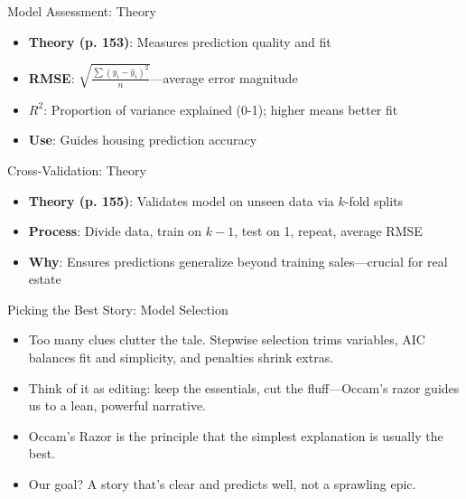 \documentclass{beamer}
\begin{document}
	
	\begin{frame}{Model Assessment: Theory}
		\begin{itemize}
			\item \textbf{Theory (p. 153)}: Measures prediction quality and fit
			\item \textbf{RMSE}: $\sqrt{\frac{\sum (y_i - \hat{y}_i)^2}{n}}$—average error magnitude
			\item \textbf{$R^2$}: Proportion of variance explained (0-1); higher means better fit
			\item \textbf{Use}: Guides housing prediction accuracy
		\end{itemize}
	\end{frame}
	
	\begin{frame}{Cross-Validation: Theory}
		\begin{itemize}
			\item \textbf{Theory (p. 155)}: Validates model on unseen data via $k$-fold splits
			\item \textbf{Process}: Divide data, train on $k-1$, test on 1, repeat, average RMSE
			\item \textbf{Why}: Ensures predictions generalize beyond training sales—crucial for real estate
		\end{itemize}
	\end{frame}

	\begin{frame}{Picking the Best Story: Model Selection}
		\begin{itemize}
			\item Too many clues clutter the tale. Stepwise selection trims variables, AIC balances fit and simplicity, and penalties shrink extras.
			\item Think of it as editing: keep the essentials, cut the fluff—Occam’s razor guides us to a lean, powerful narrative.
			\item Occam’s Razor is the principle that the simplest explanation is usually the best.
			\item Our goal? A story that’s clear and predicts well, not a sprawling epic.
		\end{itemize}
	\end{frame}	
	
\end{document}
